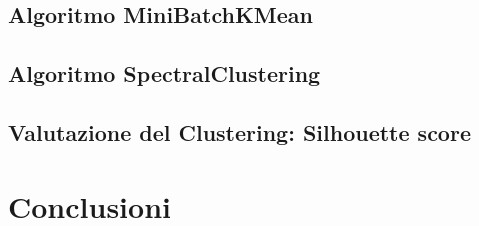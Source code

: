 \documentclass[12pt,oneside]{article}
\begin{document}
    \begin{enumerate}
    \subsection{Algoritmo MiniBatchKMean}
    \end{enumerate}

    \begin{enumerate}
    \subsection{Algoritmo SpectralClustering}
    \end{enumerate}

    \begin{enumerate}
    \subsection{Valutazione del Clustering: Silhouette score}
    \end{enumerate}

\section{Conclusioni}

    
\end{document}
